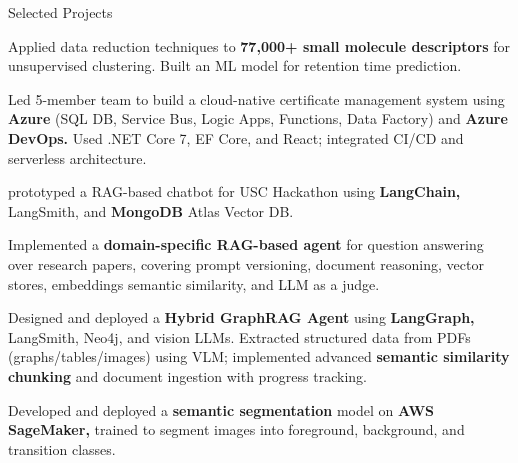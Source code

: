 \begin{cventries}
\vspace*{0.2cm}

\cventry
    {}
    {Selected Projects}
    {}
    {}
    {
        \begin{cvitemsfree}
            \item{Applied data reduction techniques to \textbf{77,000+ small molecule descriptors} for unsupervised clustering. Built an ML model for retention time prediction.}  %
            \item{Led 5-member team to build a cloud-native certificate management system using \textbf{Azure} (SQL DB, Service Bus, Logic Apps, Functions, Data Factory) and \textbf{Azure DevOps.} Used .NET Core 7, EF Core, and React; integrated CI/CD and serverless architecture.}
            \item{prototyped a RAG-based chatbot for USC Hackathon using \textbf{LangChain,} LangSmith, and \textbf{MongoDB} Atlas Vector DB.}
            \item{Implemented a \textbf{domain-specific RAG-based agent} for question answering over research papers, covering prompt versioning, document reasoning, vector stores, embeddings semantic similarity, and LLM as a judge.}
            \item{Designed and deployed a \textbf{Hybrid GraphRAG Agent} using \textbf{LangGraph,} LangSmith, Neo4j, and vision LLMs. Extracted structured data from PDFs (graphs/tables/images) using VLM; implemented advanced \textbf{semantic similarity chunking} and document ingestion with progress tracking.}
            \item{Developed and deployed a \textbf{semantic segmentation} model on \textbf{AWS SageMaker,} trained to segment images into foreground, background, and transition classes.}

\end{cvitemsfree}}
\end{cventries}
